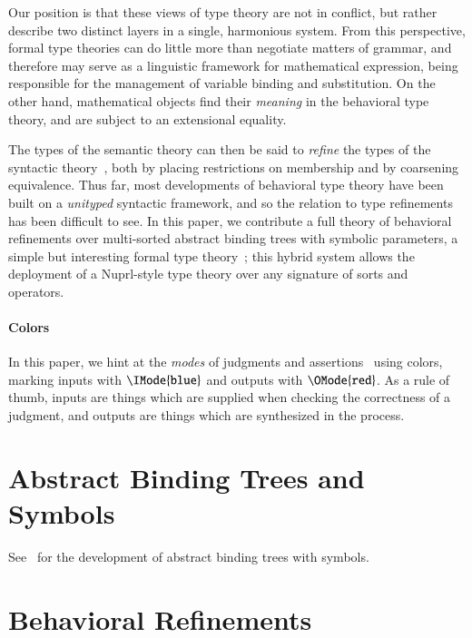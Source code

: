 \documentclass[11pt]{article}
\theoremstyle{definition}
\theoremstyle{remark}
\numberwithin{equation}{section}
\begin{document}
Our position is that these views of type theory are not in conflict, but rather
describe two distinct layers in a single, harmonious system. From this
perspective, formal type theories can do little more than negotiate matters of
grammar, and therefore may serve as a linguistic framework for mathematical
expression, being responsible for the management of variable binding and
substitution. On the other hand, mathematical objects find their \emph{meaning}
in the behavioral type theory, and are subject to an extensional equality.

The types of the semantic theory can then be said to \emph{refine} the types of
the syntactic theory~\cite{harper-davies:2014, harper-duff:2015, harper:2016},
both by placing restrictions on membership and by coarsening equivalence. Thus
far, most developments of behavioral type theory have been built on a
\emph{unityped} syntactic framework, and so the relation to type refinements
has been difficult to see. In this paper, we contribute a full theory of
behavioral refinements over multi-sorted abstract binding trees with symbolic
parameters, a simple but interesting formal type theory~\cite{harper:2016,
sterling-morrison:2015}; this hybrid system allows the deployment of a
Nuprl-style type theory over any signature of sorts and operators.

\ifcolored%
\paragraph{Colors}
In this paper, we hint at the \emph{modes} of judgments and
assertions~\cite{harper:2016} using colors, marking inputs with
$\IMode{\texttt{blue}}$ and outputs with $\OMode{\texttt{red}}$. As a rule of
thumb, inputs are things which are supplied when checking the correctness of a
judgment, and outputs are things which are synthesized in the process. \fi

\section{Abstract Binding Trees and Symbols}

See~\cite{sterling-morrison:2015} for the development of abstract binding trees
with symbols. 

\section{Behavioral Refinements}
\end{document}

